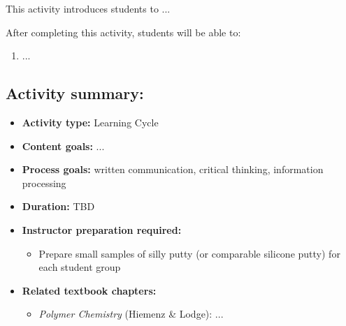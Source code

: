 %
%
%
%

\renewcommand{\figpath}{content/polymphys/mechanical-properties/viscoelasticity/figs}

\begin{activity}

\begin{instructornotes}

	This activity introduces students to ...
	
	After completing this activity, students will be able to:
			\begin{enumerate}
				\item ...
			\end{enumerate}
	
			
	\subsection*{Activity summary:}
	\begin{itemize}
		\item \textbf{Activity type:} Learning Cycle
		\item \textbf{Content goals:} ...
		\item \textbf{Process goals:} %
			written communication, critical thinking, information processing
		\item \textbf{Duration:} TBD %
		\item \textbf{Instructor preparation required:} 
			\begin{itemize}
				\item Prepare small samples of silly putty (or comparable silicone putty) for each student group
			\end{itemize}
		\item \textbf{Related textbook chapters:}
			\begin{itemize}
				\item \emph{Polymer Chemistry} (Hiemenz \& Lodge): ...
			\end{itemize}
	\end{itemize}


\end{instructornotes}
\end{activity}
